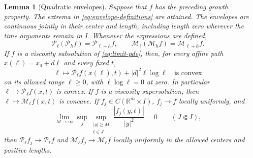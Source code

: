 \documentclass[11pt]{article}
\numberwithin{equation}{section}
\newtheorem{lemma}[theorem]{Lemma}
\theoremstyle{definition}
\theoremstyle{remark}
\newcommand{\R}{\mathbb{R}}
\newcommand{\Penv}{\mathcal{P}}
\newcommand{\Menv}{\mathcal{M}}
\begin{document}
\begin{lemma}[Quadratic envelopes]\label{lem:quadratic-envelopes}
Suppose that $f$ has the preceding growth property. The extrema
in \eqref{eq:envelope-definitions} are attained. The envelopes
are continuous jointly in their center and length, including
length zero wherever the time arguments remain in $I$. Whenever
the expressions are defined,
\begin{equation}\label{eq:envelope-composition}
  \Penv_\ell(\Penv_hf)=\Penv_{\ell+h}f,\qquad
  \Menv_\ell(\Menv_hf)=\Menv_{\ell+h}f.
\end{equation}
If $f$ is a viscosity subsolution of \eqref{eq:limit-pde}, then,
for every affine path $x(\ell)=x_0+d\ell$ and every fixed $t$,
\begin{equation}\label{eq:path-envelope-convexity}
  \ell\longmapsto
  \Penv_\ell f(x(\ell),t)+|d|^2\ell\log\ell
  \quad\text{is convex}
\end{equation}
on its allowed range $\ell\ge0$, with $\ell\log\ell=0$ at zero.
In particular $\ell\mapsto\Penv_\ell f(x,t)$ is convex.
If $f$ is a viscosity supersolution, then
$\ell\mapsto\Menv_\ell f(x,t)$ is concave.
If $f_j\in C(\R^m\times I)$, $f_j\to f$ locally uniformly, and
\[
  \lim_{M\to\infty}\sup_j\sup_{\substack{|y|\ge M\\t\in J}}
      \frac{|f_j(y,t)|}{|y|^2}=0\qquad(J\Subset I),
\]
then
$\Penv_\ell f_j\to\Penv_\ell f$ and $\Menv_\ell f_j\to\Menv_\ell f$
locally uniformly in the allowed centers and positive lengths.
\end{lemma}
\end{document}
